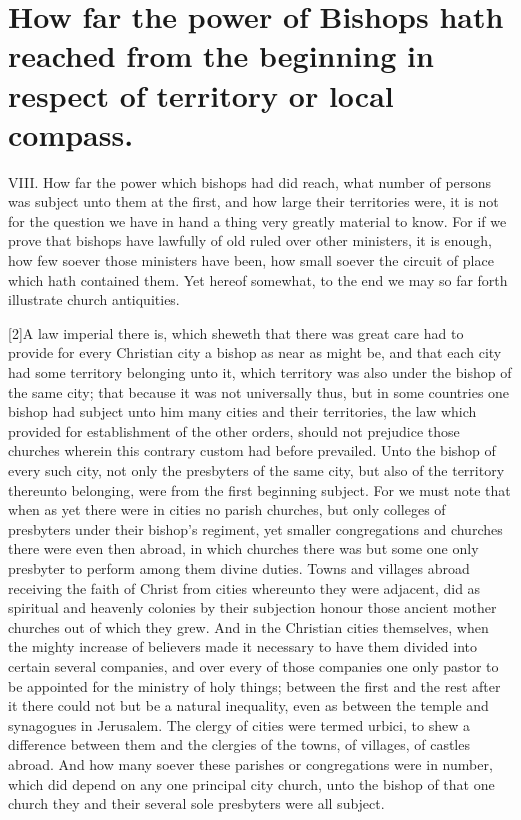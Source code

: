 \section*{How far the power of Bishops hath reached from the beginning in respect of territory or local compass.}

VIII. How far the power which bishops had did reach, what number of persons was subject unto them at the first,  and how large their territories were, it is not for the question we have in hand a thing very greatly material to know. For if we prove that bishops have lawfully of old ruled over other ministers, it is enough, how few soever those ministers have been, how small soever the circuit of place which hath contained them. Yet hereof somewhat, to the end we may so far forth illustrate church antiquities.

[2]A law imperial there is,
 which sheweth that there was great care had to provide for every Christian city a bishop as near as might be, and that each city had some territory belonging unto it, which territory was also under the bishop of the same city; that because it was not universally thus, but in some countries one bishop had subject unto him many cities and their territories, the law which provided for establishment of the other orders, should not prejudice those churches wherein this contrary custom had before prevailed. Unto the bishop of every such city, not only the presbyters of the same city, but also of the territory thereunto belonging, were from the first beginning subject. For we must note that when as yet there were in cities no parish churches, but only colleges of presbyters under their bishop’s regiment, yet smaller congregations and churches there were even then abroad, in which churches there was but some one only presbyter to perform among them divine duties. Towns and villages abroad receiving the faith of Christ from cities whereunto they were adjacent, did as spiritual and heavenly colonies by their subjection honour those ancient mother churches out of which they grew. And in the Christian cities themselves, when the mighty increase of believers made it necessary to have them divided into certain several companies, and over every of those companies one only pastor to be appointed for the ministry of  holy things;
 between the first and the rest after it there could not but be a natural inequality, even as between the temple and synagogues in Jerusalem. The clergy of cities were termed urbici, to shew a difference between them and the clergies of the towns, of villages, of castles abroad. And how many soever these parishes or congregations were in number, which did depend on any one principal city church, unto the bishop of that one church they and their several sole presbyters were all subject.

